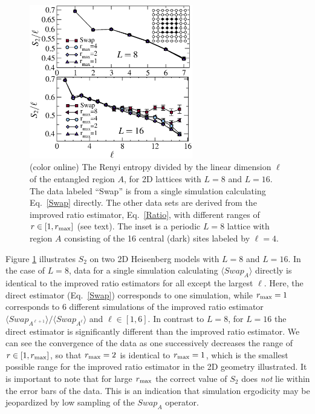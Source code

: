 \documentclass[prl,aps,twocolumn,floatfix,amsmath,amssymb,superscriptaddress,tightenlines]{revtex4}
\begin{document}
\begin{figure} {
\includegraphics[width=2.8in]{L8n16_ratio.eps} \caption{(color online) 
\label{L16fig}
The Renyi entropy divided by the linear dimension $\ell$ of the entangled region $A$, for 2D lattices with $L=8$ and $L=16$.  The data labeled ``Swap'' is from a single simulation calculating Eq.~\eqref{Swap} directly.  The other
data sets are derived from the improved ratio estimator, Eq.~\eqref{Ratio}, with different ranges of $r \in [1,r_{\rm max}]$ (see text).  The inset 
is a periodic $L=8$ lattice with region $A$ consisting of the 16 central (dark) sites labeled by $\ell = 4$.
}
} \end{figure}

Figure \ref{L16fig} illustrates $S_2$ on two 2D Heisenberg models with  $L=8$ and  $L=16$.  In the case of $L=8$, data for a single 
simulation calculating $\langle Swap_A \rangle$ directly is identical to the improved ratio estimators for all except the largest $\ell$.  
Here, the direct estimator (Eq.~\eqref{Swap}) corresponds to one simulation, while $r_{\rm max}=1$ corresponds to 6 different simulations of the improved ratio estimator ${\langle Swap_{A^{\ell+1}}\rangle}/{\langle Swap_{A^{\ell}}\rangle}$ and $\ell \in [1,6]$.
In contrast to $L=8$, for $L=16$ the direct estimator is significantly different than 
the improved ratio estimator.  We can see the convergence of the data as one successively decreases the range of $r \in [1,r_{\rm max}]$, 
so that $r_{\rm max}=2$ is identical to $r_{\rm max}=1$, which is the smallest possible range for the improved ratio estimator in the 2D geometry illustrated.  It is important to note that for large $r_{\rm max}$ the correct value of $S_2$ does {\it not} lie within the error bars of the data.  
This is an indication that simulation ergodicity may be jeopardized by low sampling of the $Swap_A$ operator.%
\end{document}
